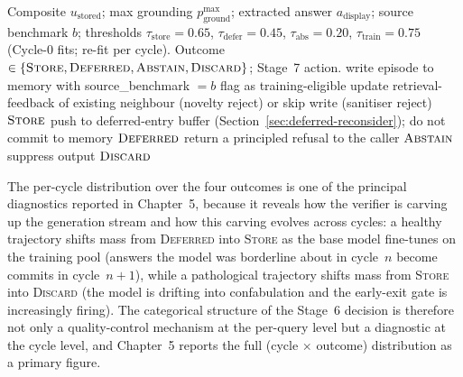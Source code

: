 \begin{algorithm}
\caption{Stage~6 decision tree and Stage~7 action.}
\label{alg:decision}
\begin{algorithmic}[1]
\Require Composite $u_{\text{stored}}$; max grounding $p_{\text{ground}}^{\max}$; extracted answer $a_{\text{display}}$; source benchmark $b$; thresholds $\tau_{\text{store}} = 0.65$, $\tau_{\text{defer}} = 0.45$, $\tau_{\text{abs}} = 0.20$, $\tau_{\text{train}} = 0.75$ (Cycle-0 fits; re-fit per cycle).
\Ensure Outcome $\in \{\textsc{Store}, \textsc{Deferred}, \textsc{Abstain}, \textsc{Discard}\}$; Stage~7 action.
        \State write episode to memory with source\_benchmark $= b$
         flag as training-eligible \EndIf
    \Else
        \State update retrieval-feedback of existing neighbour (novelty reject) or skip write (sanitiser reject)
    \EndIf
    \State \Return $\textsc{Store}$
\EndIf
{}
    \State push to deferred-entry buffer (Section~\ref{sec:deferred-reconsider}); do not commit to memory
    \State \Return $\textsc{Deferred}$
\EndIf
{}
    \State return a principled refusal to the caller
    \State \Return $\textsc{Abstain}$
\EndIf
\State suppress output
\State \Return $\textsc{Discard}$
\end{algorithmic}
\end{algorithm}

The per-cycle distribution over the four outcomes is one of the principal diagnostics reported in Chapter~5, because it reveals how the verifier is carving up the generation stream and how this carving evolves across cycles: a healthy trajectory shifts mass from \textsc{Deferred} into \textsc{Store} as the base model fine-tunes on the training pool (answers the model was borderline about in cycle~$n$ become commits in cycle~$n{+}1$), while a pathological trajectory shifts mass from \textsc{Store} into \textsc{Discard} (the model is drifting into confabulation and the early-exit gate is increasingly firing). The categorical structure of the Stage~6 decision is therefore not only a quality-control mechanism at the per-query level but a diagnostic at the cycle level, and Chapter~5 reports the full (cycle $\times$ outcome) distribution as a primary figure.


